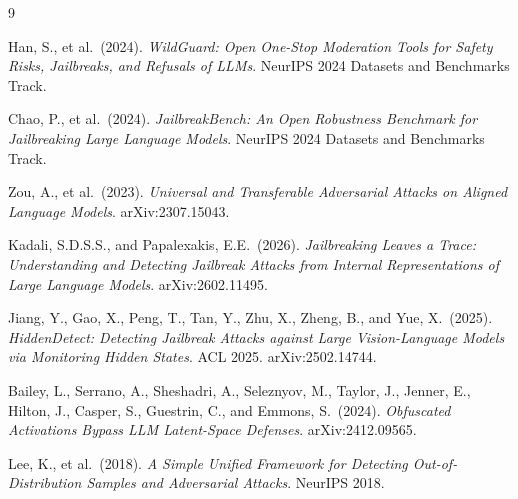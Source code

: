\documentclass[11pt,a4paper]{article}
\begin{document}
\begin{thebibliography}{9}

Han, S., et al.\ (2024).
\textit{WildGuard: Open One-Stop Moderation Tools for Safety Risks, Jailbreaks,
and Refusals of LLMs}. NeurIPS 2024 Datasets and Benchmarks Track.

Chao, P., et al.\ (2024).
\textit{JailbreakBench: An Open Robustness Benchmark for Jailbreaking Large Language Models}.
NeurIPS 2024 Datasets and Benchmarks Track.

Zou, A., et al.\ (2023).
\textit{Universal and Transferable Adversarial Attacks on Aligned Language Models}.
arXiv:2307.15043.

Kadali, S.D.S.S., and Papalexakis, E.E.\ (2026).
\textit{Jailbreaking Leaves a Trace: Understanding and Detecting Jailbreak Attacks
from Internal Representations of Large Language Models}. arXiv:2602.11495.

Jiang, Y., Gao, X., Peng, T., Tan, Y., Zhu, X., Zheng, B., and Yue, X.\ (2025).
\textit{HiddenDetect: Detecting Jailbreak Attacks against Large Vision-Language
Models via Monitoring Hidden States}. ACL 2025. arXiv:2502.14744.

Bailey, L., Serrano, A., Sheshadri, A., Seleznyov, M., Taylor, J., Jenner, E.,
Hilton, J., Casper, S., Guestrin, C., and Emmons, S.\ (2024).
\textit{Obfuscated Activations Bypass LLM Latent-Space Defenses}. arXiv:2412.09565.

Lee, K., et al.\ (2018).
\textit{A Simple Unified Framework for Detecting Out-of-Distribution Samples and
Adversarial Attacks}. NeurIPS 2018.

\end{thebibliography}
\end{document}

